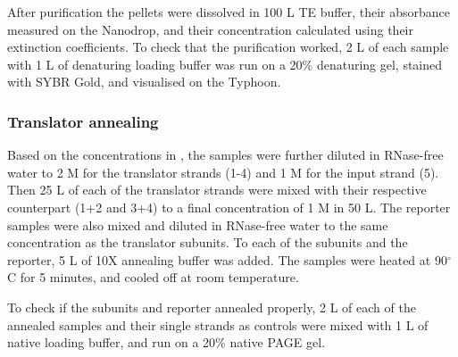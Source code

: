 After purification the pellets were dissolved in 100 \si{\micro}L TE buffer, their absorbance measured on the Nanodrop, and their concentration calculated using their extinction coefficients. To check that the purification worked, 2 \si{\micro}L of each sample with 1 \si{\micro}L of denaturing loading buffer was run on a 20\% denaturing gel, stained with SYBR Gold, and visualised on the Typhoon.


\subsubsection{Translator annealing}

Based on the concentrations in , the samples were further diluted in RNase-free water to 2 \si{\micro}M for the translator strands (1-4) and 1 \si{\micro}M for the input strand (5). Then 25 \si{\micro}L of each of the translator strands were mixed with their respective counterpart (1+2 and 3+4) to a final concentration of 1 \si{\micro}M in 50 \si{\micro}L. The reporter samples were also mixed and diluted in RNase-free water to the same concentration as the translator subunits. To each of the subunits and the reporter, 5 \si{\micro}L of 10X annealing buffer was added. The samples were heated at 90$^\circ$C for 5 minutes, and cooled off at room temperature.

To check if the subunits and reporter annealed properly, 2 \si{\micro}L of each of the annealed samples and their single strands as controls were mixed with 1 \si{\micro}L of native loading buffer, and run on a 20\% native PAGE gel.


